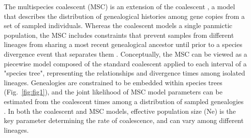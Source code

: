 \documentclass[11pt]{article}
\begin{document}

The multispecies coalescent (MSC) is an extension of the coalescent 
\citep{kingman1982coalescent}, a model that describes the distribution of genealogical 
histories among gene copies from a set of sampled individuals. Whereas the 
coalescent models a single panmictic population, the MSC includes constraints that prevent 
samples from different lineages from sharing a most recent genealogical ancestor until prior
to a species divergence event that separates them \citep{maddison1997gene,maddison2006inferring}. 
Conceptually, the MSC can be viewed as a piecewise model composed of the standard
coalescent applied to each interval of a "species tree", representing the relationships
and divergence times among isolated lineages. Genealogies are constrained to be
embedded within species trees (Fig.~\ref{fig:fig1}), and the joint likelihood of 
MSC model parameters can be estimated from the coalescent times among a 
distribution of sampled genealogies
\citep{rannala2003bayes,degnan2009gene}. In both the coalescent
and MSC models, effective population size (Ne) is the key parameter determining 
the rate of coalescence, and can vary among different lineages. 

\end{document}
